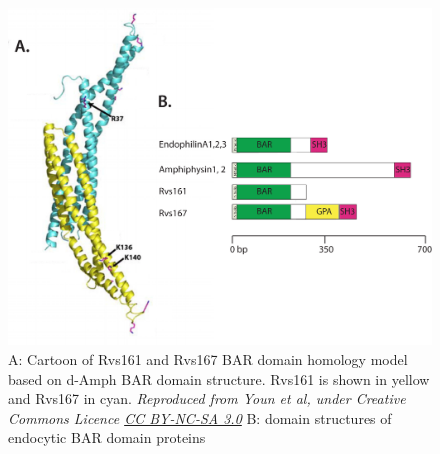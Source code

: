 \vspace{2mm}
\begin{figure}[H]
	\centering
	\includegraphics[scale=0.4]{figures/intro/Rvs_structure}
	\caption[Homolgy model of Rvs and BAR protein domains]
	{A: Cartoon of Rvs161 and Rvs167 BAR domain homology model based on d-Amph BAR domain structure. Rvs161 is shown in yellow and Rvs167 in cyan. 
	\textit{Reproduced from Youn et al, under Creative Commons Licence \href{https://creativecommons.org/licenses/by-nc-sa/3.0/}{CC BY-NC-SA 3.0}}
B: domain structures of endocytic BAR domain proteins
\label{rvs_structure}}
\end{figure}
		

